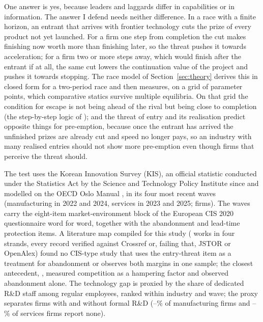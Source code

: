 \documentclass[preprint,12pt,authoryear]{elsarticle}
\begin{document}
One answer is yes, because leaders and laggards differ in capabilities or in information. The answer I defend needs neither difference. In a race with a finite horizon, an entrant that arrives with frontier technology cuts the prize of every product not yet launched. For a firm one step from completion the cut makes finishing now worth more than finishing later, so the threat pushes it towards acceleration; for a firm two or more steps away, which would finish after the entrant if at all, the same cut lowers the continuation value of the project and pushes it towards stopping. The race model of Section~\ref{sec:theory} derives this in closed form for a two-period race and then measures, on a grid of \GridPoints{} parameter points, which comparative statics survive multiple equilibria. On that grid the condition for escape is not being ahead of the rival but being close to completion (the step-by-step logic of \citealp{aghion2009entry}); and the threat of entry and its realisation predict opposite things for pre-emption, because once the entrant has arrived the unfinished prizes are already cut and speed no longer pays, so an industry with many realised entries should not show more pre-emption even though firms that perceive the threat should.

The test uses the Korean Innovation Survey (KIS), an official statistic conducted under the Statistics Act by the Science and Technology Policy Institute since \KISSinceYear{} and modelled on the OECD Oslo Manual \citep{oecd2018oslo}, in its four most recent waves (manufacturing in 2022 and 2024, services in 2023 and 2025; \NFirms{} firms). The waves carry the eight-item market-environment block of the European CIS 2020 questionnaire word for word, together with the abandonment and lead-time protection items. A literature map compiled for this study (\LitMapWorks{} works in four strands, every record verified against Crossref or, failing that, JSTOR or OpenAlex) found no CIS-type study that uses the entry-threat item as a treatment for abandonment or observes both margins in one sample; the closest antecedent, \citet{garciavega2010determinants}, measured competition as a hampering factor and observed abandonment alone. The technology gap is proxied by the share of dedicated R\&D staff among regular employees, ranked within industry and wave; the proxy separates firms with and without formal R\&D (\ShareZeroRDManuMinPct--\ShareZeroRDManuMaxPct\% of manufacturing firms and \ShareZeroRDServMinPct--\ShareZeroRDServMaxPct\% of services firms report none).
\end{document}
